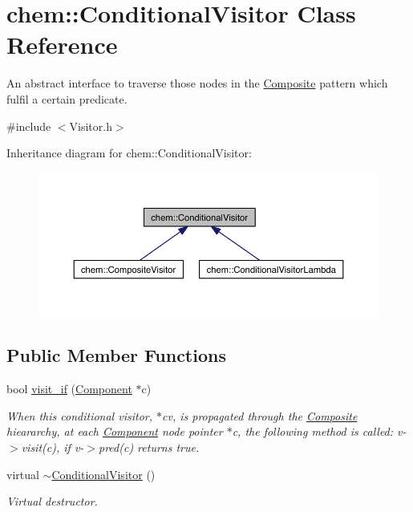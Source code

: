 \hypertarget{classchem_1_1ConditionalVisitor}{\section{chem\-:\-:Conditional\-Visitor Class Reference}
\label{classchem_1_1ConditionalVisitor}
}


An abstract interface to traverse those nodes in the \hyperlink{classchem_1_1Composite}{Composite} pattern which fulfil a certain predicate.  




{\ttfamily \#include $<$Visitor.\-h$>$}



Inheritance diagram for chem\-:\-:Conditional\-Visitor\-:
\nopagebreak
\begin{figure}[H]
\begin{center}
\leavevmode
\includegraphics[width=350pt]{classchem_1_1ConditionalVisitor__inherit__graph}
\end{center}
\end{figure}
\subsection*{Public Member Functions}
\begin{DoxyCompactItemize}
\item 
bool \hyperlink{classchem_1_1ConditionalVisitor_ac45c876078f55ff30c70d89527167bc1}{visit\-\_\-if} (\hyperlink{classchem_1_1Component}{Component} $\ast$c)
\begin{DoxyCompactList}\small\item\em When this conditional visitor, $\ast$cv, is propagated through the \hyperlink{classchem_1_1Composite}{Composite} hieararchy, at each \hyperlink{classchem_1_1Component}{Component} node pointer $\ast$c, the following method is called\-: v-\/$>$visit(c), if v-\/$>$pred(c) returns true. \end{DoxyCompactList}\item 
virtual \hyperlink{classchem_1_1ConditionalVisitor_ad4f7c23e000b587469b74455e5c1a8b7}{$\sim$\-Conditional\-Visitor} ()
\begin{DoxyCompactList}\small\item\em Virtual destructor. \end{DoxyCompactList}\end{DoxyCompactItemize}
